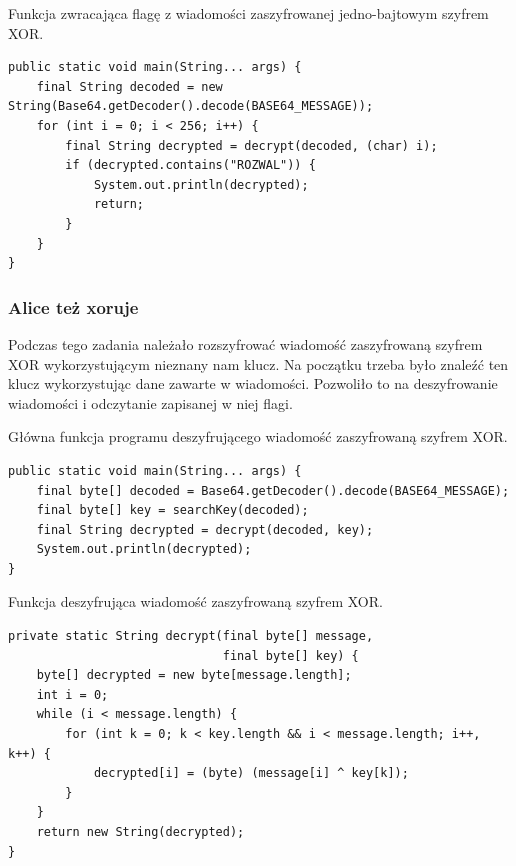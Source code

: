\documentclass[12pt,a4paper,titlepage]{article}
\begin{document}
\begin{listing}[H]
\caption{Funkcja zwracająca flagę z wiadomości zaszyfrowanej jedno-bajtowym szyfrem XOR.}
\begin{verbatim}
public static void main(String... args) {
    final String decoded = new String(Base64.getDecoder().decode(BASE64_MESSAGE));
    for (int i = 0; i < 256; i++) {
        final String decrypted = decrypt(decoded, (char) i);
        if (decrypted.contains("ROZWAL")) {
            System.out.println(decrypted);
            return;
        }
    }
}
\end{verbatim}
\end{listing}

\subsubsection{Alice też xoruje}

Podczas tego zadania należało rozszyfrować wiadomość zaszyfrowaną szyfrem XOR wykorzystującym nieznany nam klucz. Na początku trzeba było znaleźć ten klucz wykorzystując dane zawarte w wiadomości. Pozwoliło to na deszyfrowanie wiadomości i odczytanie zapisanej w niej flagi.

\begin{listing}[H]
\caption{Główna funkcja programu deszyfrującego wiadomość zaszyfrowaną szyfrem XOR.}
\begin{verbatim}
public static void main(String... args) {
    final byte[] decoded = Base64.getDecoder().decode(BASE64_MESSAGE);
    final byte[] key = searchKey(decoded);
    final String decrypted = decrypt(decoded, key);
    System.out.println(decrypted);
}
\end{verbatim}
\end{listing}

\begin{listing}[H]
\caption{Funkcja deszyfrująca wiadomość zaszyfrowaną szyfrem XOR.}
\begin{verbatim}
private static String decrypt(final byte[] message,
                              final byte[] key) {
    byte[] decrypted = new byte[message.length];
    int i = 0;
    while (i < message.length) {
        for (int k = 0; k < key.length && i < message.length; i++, k++) {
            decrypted[i] = (byte) (message[i] ^ key[k]);
        }
    }
    return new String(decrypted);
}
\end{verbatim}
\end{listing}
\end{document}
